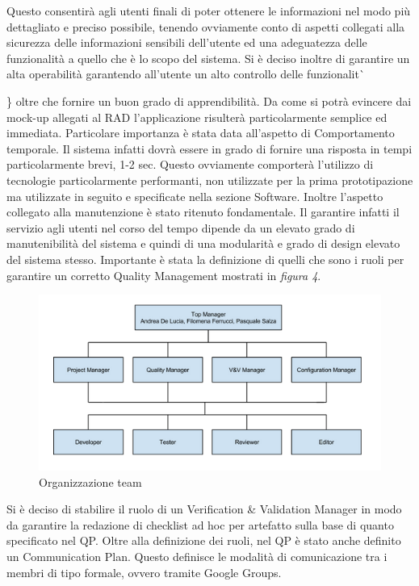 Questo consentir\`{a} agli utenti finali di poter ottenere le informazioni nel modo pi\`{u} dettagliato e preciso possibile, tenendo ovviamente conto di aspetti collegati alla sicurezza delle informazioni sensibili dell\rq utente ed una adeguatezza delle funzionalit\`{a} a quello che \`{e} lo scopo del sistema.
Si \`{e} deciso inoltre di garantire un alta operabilit\`{a} garantendo all\rq utente un alto controllo delle funzionalit\`{\} oltre che fornire un buon grado di apprendibilit\`{a}.
Da come si potr\`{a} evincere dai mock-up allegati al RAD l’applicazione risulter\`{a} particolarmente semplice ed immediata.
Particolare importanza \`{e} stata data all’aspetto di Comportamento temporale. Il sistema infatti dovr\`{a} essere in grado di fornire una risposta in tempi particolarmente brevi, 1-2 sec.
Questo ovviamente comporter\`{a} l’utilizzo di tecnologie particolarmente performanti, non utilizzate per la prima prototipazione ma utilizzate in seguito e specificate nella sezione Software.
Inoltre l\rq aspetto collegato alla manutenzione \`{e} stato ritenuto fondamentale. Il garantire infatti il servizio agli utenti nel corso del tempo dipende da un elevato grado di manutenibilit\`{a} del sistema e quindi di una modularit\`{a} e grado di design elevato del sistema stesso.
Importante \`{e} stata la definizione di quelli che sono i ruoli per garantire un corretto Quality Management mostrati in \emph{figura 4}.
\begin{figure}[tp]
\centering
\includegraphics[scale=.7]{img/10.png}
\caption{Organizzazione team}
\label{fig:cd}
\end{figure}
Si \`{e} deciso di stabilire il ruolo di un Verification \& Validation Manager in modo da garantire la redazione di checklist ad hoc per artefatto sulla base di quanto specificato nel QP.
Oltre alla definizione dei ruoli, nel QP \`{e} stato anche definito un Communication Plan. Questo definisce le modalit\`{a} di comunicazione tra i membri di tipo formale, ovvero tramite Google Groups.
}
